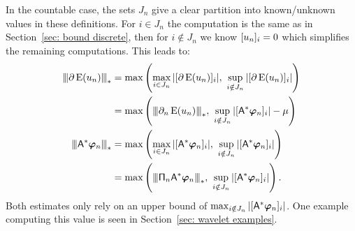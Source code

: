 \documentclass[smallextended]{svjour3}
\newcommand{\Norm}[1]{{\left\vert\kern-0.25ex\left\vert\kern-0.25ex\left\vert #1 \right\vert\kern-0.25ex\right\vert\kern-0.25ex\right\vert}}
\newcommand{\op}[1]{\operatorname{#1}}
\newcommand{\1}{\F{1}}
\newcommand*{\var}[1]{%
	\IfEqCase{#1}{%
		{0}{u}%
		{1}{v}%
		{2}{w}%
	}[u#1]%
}
\begin{document}
	In the countable case, the sets $J_n$ give a clear partition into known/unknown values in these definitions. For $i\in J_n$ the computation is the same as in Section~\ref{sec: bound discrete}, then for $i\notin J_n$ we know $[\var0_n]_i=0$ which simplifies the remaining computations. This leads to:
	\begin{align}
		\Norm{\partial\op{E}(\var0_n)}_* &= \max\left(\max_{i\in J_n}|[\partial\op{E}(\var0_n)]_i|,\ \sup_{i\notin J_n} |[\partial\op{E}(\var0_n)]_i|\right)
		\\&= \max\left(\Norm{\partial_n\op{E}(\var0_n)}_*,\ \sup_{i\notin J_n} |[\A^*\vec{\varphi}_n]_i|-\mu\right)
		\\ \Norm{\A^*\vec{\varphi}_n}_* &= \max\left(\max_{i\in J_n}|[\A^*\vec{\varphi}_n]_i|,\ \sup_{i\notin J_n} |[\A^*\vec{\varphi}_n]_i|\right)
		\\ &= \max\left(\Norm{\tens{\Pi}_n\A^*\vec{\varphi}_n}_*,\ \sup_{i\notin J_n} |[\A^*\vec{\varphi}_n]_i|\right).
	\end{align}
	Both estimates only rely on an upper bound of $\max_{i\notin J_n} |[\A^*\vec{\varphi}_n]_i|$. One example computing this value is seen in Section~\ref{sec: wavelet examples}.
	
\end{document}
